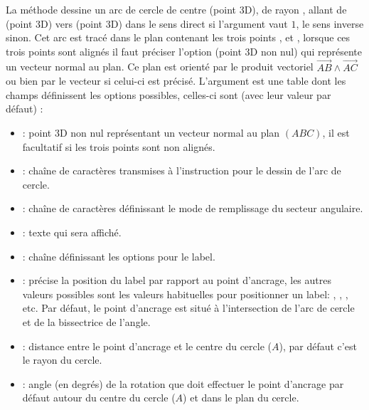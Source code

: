 La méthode  dessine un arc de cercle de centre  (point 3D), de rayon , allant de  (point 3D) vers  (point 3D) dans le sens direct si l'argument  vaut $1$, le sens inverse sinon. Cet arc est tracé dans le plan contenant les trois points ,  et , lorsque ces trois points sont alignés il faut préciser l'option  (point 3D non nul) qui représente un vecteur normal au plan. Ce plan est orienté par le produit vectoriel $\vec{AB}\wedge\vec{AC}$ ou bien par le vecteur  si celui-ci est précisé. L'argument est une table dont les champs définissent les options possibles, celles-ci sont (avec leur valeur par défaut) :
\begin{itemize}
    \item {} : point 3D non nul représentant un vecteur normal au plan $(ABC)$, il est facultatif si les trois points sont non alignés.
    
    \item {} : chaîne de caractères transmises à l'instruction \drawcmd pour le dessin de l'arc de cercle.
    
    \item {} : chaîne de caractères définissant le mode de remplissage du secteur angulaire.
    
    \item {} : texte qui sera affiché.
    
    \item {} : chaîne définissant les options pour le label.
    
    \item {} : précise la position du label par rapport au point d'ancrage, les autres valeurs possibles sont les valeurs habituelles pour positionner un label: , , , etc. Par défaut, le point d'ancrage est situé à l'intersection de l'arc de cercle et de la bissectrice de l'angle.
    
    \item {} : distance entre le point d'ancrage et le centre du cercle ($A$), par défaut c'est le rayon  du cercle.
    
    \item {} : angle (en degrés) de la rotation que doit effectuer le point d'ancrage par défaut autour du centre du cercle ($A$) et dans le plan du cercle.
    

\end{itemize}
